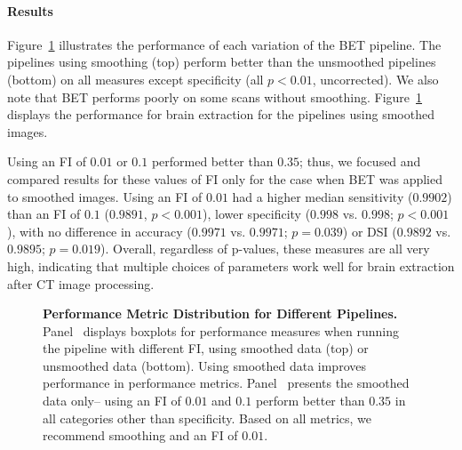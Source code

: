 \documentclass[10pt]{article}\usepackage[]{graphicx}\usepackage[]{color}
\begin{document}
\vspace{-0.4cm}
\paragraph*{Results}
Figure~\ref{fig:metrics}\protect{} illustrates the performance of each variation of the BET pipeline.  The pipelines using smoothing (top) perform better than the unsmoothed pipelines (bottom) on all measures except specificity (all $p < 0.01$, uncorrected).  We also note that BET performs poorly on some scans without smoothing.  Figure~\ref{fig:metrics}\protect{} displays the performance for brain extraction for the pipelines using smoothed images. 

Using an FI of $0.01$ or $0.1$ performed better than $0.35$; thus, we focused and compared results for these values of FI only for the case when BET was applied to smoothed images.  Using an FI of $0.01$ had a higher median sensitivity ($0.9902$) than an FI of $0.1$ ($0.9891$, $p< 0.001$), lower specificity ($0.998$ vs. $0.998$; $p< 0.001$), with no difference in accuracy ($0.9971$ vs. $0.9971$; $p= 0.039$) or DSI ($0.9892$ vs. $0.9895$; $p= 0.019$).  Overall, regardless of p-values, these measures are all very high, indicating that multiple choices of parameters work well for brain extraction after CT image processing.

\vspace{-0.5cm}
\begin{figure}
\hfill
\caption{{\bf Performance Metric Distribution for Different Pipelines.} Panel~\protect{} displays boxplots for performance measures when running the pipeline with different FI, using smoothed data (top) or unsmoothed data (bottom).   Using smoothed data improves performance in performance metrics.  Panel~\protect{} presents the smoothed data only-- using an FI of $0.01$ and $0.1$ perform better than $0.35$ in all categories other than specificity. Based on all metrics, we recommend smoothing and an FI of $0.01$.}
\label{fig:metrics}
\end{figure}
\end{document}
